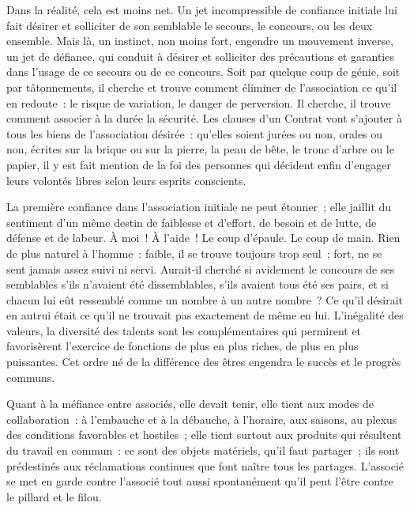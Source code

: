 \documentclass[french,twoside]{book} %
\begin{document}
Dans la réalité, cela est moins net. Un jet incompressible de confiance initiale lui fait désirer et solliciter de son semblable le secours, le concours, ou les deux ensemble. Mais là, un instinct, non moins fort, engendre un mouvement inverse, un jet de défiance, qui conduit à désirer et solliciter des précautions et garanties dans l’usage de ce secours ou de ce concours. Soit par quelque coup de génie, soit par tâtonnements, il cherche et trouve comment éliminer de l’association ce qu’il en redoute : le risque de variation, le danger de perversion. Il cherche, il trouve comment associer à la durée la sécurité. Les clauses d’un Contrat vont s’ajouter à tous les biens de l’association désirée : qu’elles soient jurées ou non, orales ou non, écrites sur la brique ou sur la pierre, la peau de bête, le tronc d’arbre ou le papier, il y est fait mention de la foi des personnes qui décident enfin d’engager leurs volontés libres selon leurs esprits conscients.\par
La première confiance dans l’association initiale ne peut étonner ; elle jaillit du sentiment d’un même destin de faiblesse et d’effort, de besoin et de lutte, de défense et de labeur. À moi ! À l’aide ! Le coup d’épaule. Le coup de main. Rien de plus naturel à l’homme : faible, il se trouve toujours trop seul ; fort, ne se sent jamais assez suivi ni servi. Aurait-il cherché si avidement le concours de ses semblables s’ils n’avaient été dissemblables, s’ils avaient tous été ses pairs, et si chacun lui eût ressemblé comme un nombre à un autre nombre ? Ce qu’il désirait en autrui était ce qu’il ne trouvait pas exactement de même en lui. L’inégalité des valeurs, la diversité des talents sont les complémentaires qui permirent et favorisèrent l’exercice de fonctions de plus en plus riches, de plus en plus puissantes. Cet ordre né de la différence des êtres engendra le succès et le progrès communs.\par
Quant à la méfiance entre associés, elle devait tenir, elle tient aux modes de collaboration : à l’embauche et à la débauche, à l’horaire, aux saisons, au plexus des conditions favorables et hostiles ; elle tient surtout aux produits qui résultent du travail en commun : ce sont des objets matériels, qu’il faut partager ; ils sont prédestinés aux réclamations continues que font naître tous les partages. L’associé se met en garde contre l’associé tout aussi spontanément qu’il peut l’être contre le pillard et le filou.\par
\end{document}
